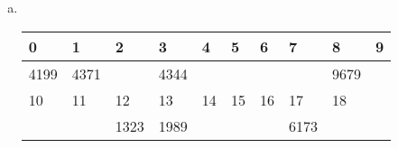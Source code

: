 \documentclass{article}
\begin{document}
\begin{enumerate}[(a)]
\begin{center}
\end{center}
\item\ 
\begin{center}
\begin{tabular}{|m{2em}<{\centering}|m{2em}<{\centering}|m{2em}<{\centering}|m{2em}<{\centering}|m{2em}<{\centering}|m{2em}<{\centering}|m{2em}<{\centering}|m{2em}<{\centering}|m{2em}<{\centering}|m{2em}<{\centering}|}
\hline
0 & 1 & 2 & 3 & 4 & 5 & 6 & 7 & 8 & 9 \\\hline
4199 & 4371 && 4344 &&&&& 9679 & \\\hline
10 & 11 & 12 & 13 & 14 & 15 & 16 & 17 & 18 & \\\hline
& & 1323 & 1989 & & & & 6173 & & \\\hline
\end{tabular}
\end{center}
\end{enumerate}
\end{document}
